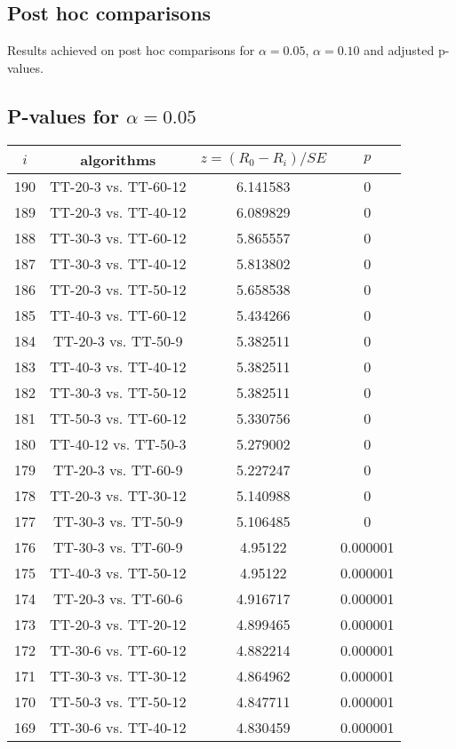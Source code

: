 \documentclass[a4paper,10pt]{article}
\begin{document}
\begin{landscape}
\pagebreak

\section{Post hoc comparisons}

Results achieved on post hoc comparisons for $\alpha = 0.05$, $\alpha = 0.10$ and adjusted p-values.

\subsection{P-values for $\alpha=0.05$}

\begin{table}[!htp]
\centering\scriptsize
\begin{tabular}{cccc}
$i$&algorithms&$z=(R_0 - R_i)/SE$&$p$\\
\hline190&TT-20-3 vs. TT-60-12&6.141583&0\\
189&TT-20-3 vs. TT-40-12&6.089829&0\\
188&TT-30-3 vs. TT-60-12&5.865557&0\\
187&TT-30-3 vs. TT-40-12&5.813802&0\\
186&TT-20-3 vs. TT-50-12&5.658538&0\\
185&TT-40-3 vs. TT-60-12&5.434266&0\\
184&TT-20-3 vs. TT-50-9&5.382511&0\\
183&TT-40-3 vs. TT-40-12&5.382511&0\\
182&TT-30-3 vs. TT-50-12&5.382511&0\\
181&TT-50-3 vs. TT-60-12&5.330756&0\\
180&TT-40-12 vs. TT-50-3&5.279002&0\\
179&TT-20-3 vs. TT-60-9&5.227247&0\\
178&TT-20-3 vs. TT-30-12&5.140988&0\\
177&TT-30-3 vs. TT-50-9&5.106485&0\\
176&TT-30-3 vs. TT-60-9&4.95122&0.000001\\
175&TT-40-3 vs. TT-50-12&4.95122&0.000001\\
174&TT-20-3 vs. TT-60-6&4.916717&0.000001\\
173&TT-20-3 vs. TT-20-12&4.899465&0.000001\\
172&TT-30-6 vs. TT-60-12&4.882214&0.000001\\
171&TT-30-3 vs. TT-30-12&4.864962&0.000001\\
170&TT-50-3 vs. TT-50-12&4.847711&0.000001\\
169&TT-30-6 vs. TT-40-12&4.830459&0.000001\\

\end{tabular}
\end{table}
\end{landscape}
\end{document}
